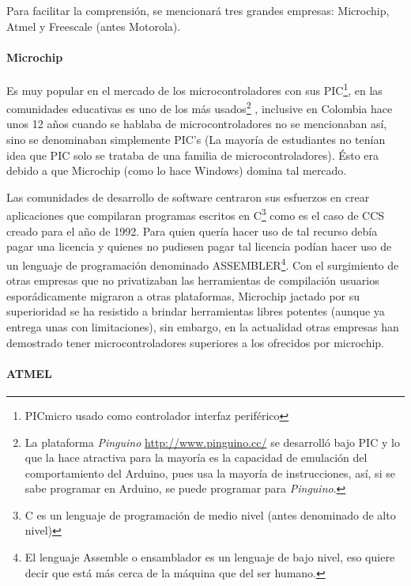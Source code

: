 \documentclass{article}
\begin{document}
Para facilitar la comprensión, se mencionará tres grandes empresas: 
Microchip, Atmel y Freescale (antes Motorola).

\paragraph{Microchip} 

Es muy popular en el mercado de los microcontroladores con sus
PIC\footnote{PICmicro usado como controlador interfaz periférico}, en las
comunidades educativas es uno de los más usados\footnote{ 
La plataforma \textit{Pinguino} \url{http://www.pinguino.cc/}
se desarrolló bajo PIC y lo que la hace atractiva para la mayoría es la 
capacidad de emulación del comportamiento del Arduino, pues usa la mayoría 
de instrucciones, así, 
si se sabe programar en Arduino, se puede programar para \textit{Pinguino}.}
, inclusive en Colombia hace unos 12 años cuando se hablaba de 
microcontroladores no se mencionaban así, sino se denominaban simplemente 
PIC's (La mayoría de estudiantes no tenían idea que PIC solo se trataba de 
una familia de microcontroladores). Ésto era debido a que Microchip (como 
lo hace Windows) domina tal mercado.

Las comunidades de desarrollo de 
software centraron sus esfuerzos en crear aplicaciones que compilaran 
programas escritos en C\footnote{ C es un lenguaje de programación de 
medio nivel (antes denominado de alto nivel)} como es el caso de CCS creado
para el año de 1992. Para quien quería hacer uso de tal recurso debía pagar
una licencia y quienes no pudiesen pagar tal licencia podían hacer uso
de un lenguaje de programación denominado ASSEMBLER\footnote{El lenguaje 
		Assemble o ensamblador es un lenguaje de bajo nivel, eso quiere
decir que está más cerca de la máquina que del ser humano.}. Con el
surgimiento de otras empresas que no privatizaban las herramientas de 
compilación usuarios esporádicamente migraron a otras plataformas,
Microchip jactado por su superioridad se ha resistido a brindar herramientas
libres potentes (aunque ya entrega unas con limitaciones), sin embargo, en
la actualidad otras empresas han demostrado tener microcontroladores 
superiores a los ofrecidos por microchip.

\paragraph{ATMEL}
\end{document}
